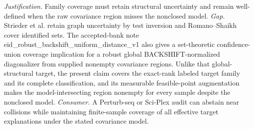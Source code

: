 \documentclass{article}
\begin{document}
\par\smallskip\noindent \textit{Justification.} Family coverage must retain structural uncertainty and remain well-defined when the raw covariance region misses the nonclosed model. \textit{Gap.} Strieder et al. retain graph uncertainty by test inversion and Romano--Shaikh cover identified sets.  The accepted-bank note eid\_robust\_backshift\_uniform\_distance\_v1 also gives a set-theoretic confidence-union coverage implication for a robust global BACKSHIFT-normalized diagonalizer from supplied nonempty covariance regions.  Unlike that global-structural target, the present claim covers the exact-rank labeled target family and its complete classification, and its measurable feasible-point augmentation makes the model-intersecting region nonempty for every sample despite the nonclosed model. \textit{Consumer.} A Perturb-seq or Sci-Plex audit can abstain near collisions while maintaining finite-sample coverage of all effective target explanations under the stated covariance model.
\end{document}
